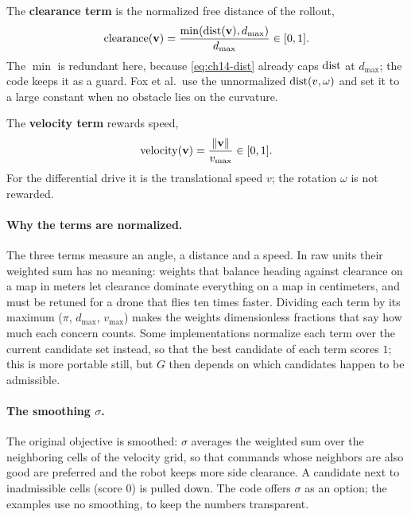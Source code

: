 \begin{definition}
\label{def:ch14-clearance}
The \textbf{clearance term} is
the normalized free distance of the rollout,
\begin{equation}
  \mathrm{clearance}(\mathbf{v}) = \frac{\min(\operatorname{dist}(\mathbf{v}), d_{\max})}{d_{\max}} \in [0, 1].
  \label{eq:ch14-clearance}
\end{equation}
The $\min$ is redundant here, because \cref{eq:ch14-dist} already caps
$\operatorname{dist}$ at $d_{\max}$; the code keeps it as a guard. Fox et al.\ use the
unnormalized $\operatorname{dist}(v, \omega)$ and set it to a large constant when no
obstacle lies on the curvature.
\end{definition}

\begin{definition}
\label{def:ch14-velocity}
The \textbf{velocity term}
rewards speed,
\begin{equation}
  \mathrm{velocity}(\mathbf{v}) = \frac{\left\lVert \mathbf{v} \right\rVert}{v_{\max}} \in [0, 1].
  \label{eq:ch14-velocity}
\end{equation}
For the differential drive it is the translational speed $v$; the rotation
$\omega$ is not rewarded.
\end{definition}

\paragraph{Why the terms are normalized.}
The three terms measure an angle, a distance and a speed. In raw units
their weighted sum has no meaning: weights that balance heading against
clearance on a map in meters let clearance dominate everything on a map in
centimeters, and must be retuned for a drone that flies ten times faster.
Dividing each term by its maximum ($\pi$, $d_{\max}$, $v_{\max}$) makes the
weights dimensionless fractions that say how much each concern counts.
Some implementations normalize each term over the current candidate set
instead, so that the best candidate of each term scores $1$; this is more
portable still, but $G$ then depends on which candidates happen to be
admissible.

\paragraph{The smoothing $\sigma$.}
The original objective is smoothed: $\sigma$ averages the weighted sum
over the neighboring cells of the velocity grid, so that commands whose
neighbors are also good are preferred and the robot keeps more side
clearance. A candidate next to inadmissible cells (score $0$)
is pulled down. The code offers $\sigma$ as an option; the examples use no
smoothing, to keep the numbers transparent.

